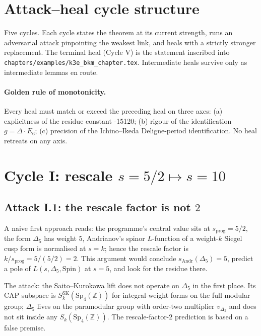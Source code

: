 
\section*{Attack--heal cycle structure}

Five cycles.  Each cycle states the theorem at its current strength,
runs an adversarial attack pinpointing the weakest link, and heals
with a strictly stronger replacement.  The terminal heal (Cycle V)
is the statement inscribed into
\texttt{chapters/examples/k3e\_bkm\_chapter.tex}.  Intermediate heals
survive only as intermediate lemmas en route.

\paragraph{Golden rule of monotonicity.}
Every heal must match or exceed the preceding heal on three axes:
(a) explicitness of the residue constant -15120; (b) rigour of the
identification $g = \Delta \cdot E_6$; (c) precision of the
Ichino--Ikeda Deligne-period identification.  No heal retreats on
any axis.


\section{Cycle I: rescale $s = 5/2 \mapsto s = 10$}
\label{sec:cycle-1-rescale}

\subsection*{Attack I.1: the rescale factor is not $2$}

A naive first approach reads: the programme's central value sits at
$s_{\mathrm{prog}} = 5/2$, the form $\Delta_5$ has weight $5$,
Andrianov's spinor $L$-function of a weight-$k$ Siegel cusp form is
normalised at $s = k$; hence the rescale factor is $k /
s_{\mathrm{prog}} = 5 / (5/2) = 2$.  This argument would conclude
$s_{\mathrm{Andr}}(\Delta_5) = 5$, predict a pole of
$L(s, \Delta_5, \mathrm{Spin})$ at $s = 5$, and look for the residue
there.

The attack: the Saito--Kurokawa lift does not operate on $\Delta_5$
in the first place.  Its CAP subspace is $S_k^{\mathrm{SK}}(\mathrm{Sp}_4(\mathbb{Z}))$
for integral-weight forms on the full modular group; $\Delta_5$
lives on the paramodular group with order-two multiplier $v_{\Delta_5}$
and does not sit inside any $S_k(\mathrm{Sp}_4(\mathbb{Z}))$.  The
rescale-factor-$2$ prediction is based on a false premise.

